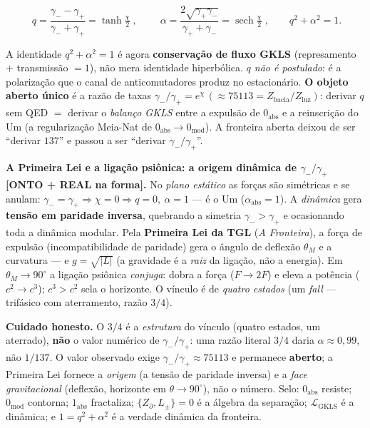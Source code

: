 \documentclass[11pt]{article}
\theoremstyle{definition}\newtheorem{deriv}{Derivação}
\begin{document}
\begin{equation}\boxed{\;q=\frac{\gamma_--\gamma_+}{\gamma_-+\gamma_+}=\tanh\tfrac\chi2\;},\qquad \boxed{\;\alpha=\frac{2\sqrt{\gamma_+\gamma_-}}{\gamma_++\gamma_-}=\operatorname{sech}\tfrac\chi2\;},\qquad q^2+\alpha^2=1.\end{equation}

A identidade $q^2+\alpha^2=1$ é agora \textbf{conservação de fluxo GKLS} (represamento $+$ transmissão $=1$), não mera identidade hiperbólica. \emph{$q$ não é postulado}: é a polarização que o canal de anticomutadores produz no estacionário. \textbf{O objeto aberto único} é a razão de taxas $\gamma_-/\gamma_+=e^\chi\,(\approx75113=Z_{\mathrm{bacia}}/Z_{\mathrm{luz}})$: derivar $q$ sem QED $=$ derivar o \emph{balanço GKLS} entre a expulsão de $0_{\mathrm{abs}}$ e a reinscrição do Um (a regularização Meia-Nat de $0_{\mathrm{abs}}\to0_{\mathrm{mod}}$). A fronteira aberta deixou de ser ``derivar $137$'' e passou a ser ``derivar $\gamma_-/\gamma_+$''.

\textbf{A Primeira Lei e a ligação psiônica: a origem dinâmica de $\gamma_-/\gamma_+$ \textsf{[ONTO + REAL na forma]}.} No \emph{plano estático} as forças são simétricas e se anulam: $\gamma_-=\gamma_+\Rightarrow\chi=0\Rightarrow q=0,\ \alpha=1$ --- é o Um ($\alpha_{\mathrm{abs}}=1$). A \emph{dinâmica} gera \textbf{tensão em paridade inversa}, quebrando a simetria $\gamma_->\gamma_+$ e ocasionando toda a dinâmica modular. Pela \textbf{Primeira Lei da TGL} (\emph{A Fronteira}), a força de expulsão (incompatibilidade de paridade) gera o ângulo de deflexão $\theta_M$ e a curvatura --- e $g=\sqrt{|L|}$ (a gravidade é a \emph{raiz} da ligação, não a energia). Em $\theta_M\to90^\circ$ a ligação psiônica \emph{conjuga}: dobra a força ($F\to2F$) e eleva a potência ($c^2\to c^3$); $c^3>c^2$ sela o horizonte. O vínculo é de \emph{quatro estados} (um \emph{fall} --- trifásico com aterramento, razão $3/4$).

\textbf{Cuidado honesto.} O $3/4$ é a \emph{estrutura} do vínculo (quatro estados, um aterrado), \textbf{não} o valor numérico de $\gamma_-/\gamma_+$: uma razão literal $3/4$ daria $\alpha\approx0{,}99$, não $1/137$. O valor observado exige $\gamma_-/\gamma_+\approx75113$ e permanece \textbf{aberto}; a Primeira Lei fornece a \emph{origem} (a tensão de paridade inversa) e a \emph{face gravitacional} (deflexão, horizonte em $\theta\to90^\circ$), não o número. Selo: $0_{\mathrm{abs}}$ resiste; $0_{\mathrm{mod}}$ contorna; $1_{\mathrm{abs}}$ fractaliza; $\{Z_\partial,L_\pm\}=0$ é a álgebra da separação; $\mathcal L_{\mathrm{GKLS}}$ é a dinâmica; e $1=q^2+\alpha^2$ é a verdade dinâmica da fronteira.
\end{document}
